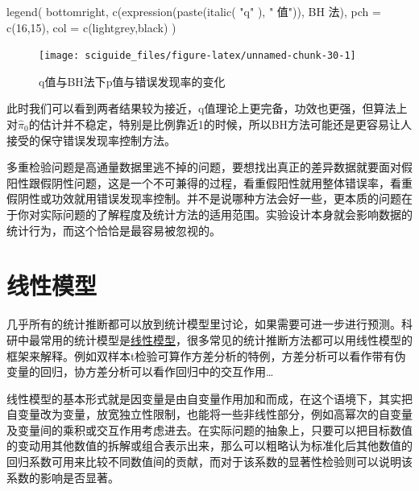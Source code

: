\documentclass[]{tufte-book}
\newenvironment{Shaded}{}{}
\newcommand{\AttributeTok}[1]{\textcolor[rgb]{0.49,0.56,0.16}{#1}}
\newcommand{\DecValTok}[1]{\textcolor[rgb]{0.25,0.63,0.44}{#1}}
\newcommand{\FunctionTok}[1]{\textcolor[rgb]{0.02,0.16,0.49}{#1}}
\newcommand{\NormalTok}[1]{#1}
\newcommand{\StringTok}[1]{\textcolor[rgb]{0.25,0.44,0.63}{#1}}
\begin{document}
\begin{Shaded}
\begin{Highlighting}[]
\FunctionTok{legend}\NormalTok{(}
  \StringTok{\textquotesingle{}bottomright\textquotesingle{}}\NormalTok{,}
  \FunctionTok{c}\NormalTok{(}\FunctionTok{expression}\NormalTok{(}\FunctionTok{paste}\NormalTok{(}\FunctionTok{italic}\NormalTok{(}
    \StringTok{"q"}
\NormalTok{  ), }\StringTok{" 值"}\NormalTok{)), }\StringTok{\textquotesingle{}BH 法\textquotesingle{}}\NormalTok{),}
  \AttributeTok{pch =} \FunctionTok{c}\NormalTok{(}\DecValTok{16}\NormalTok{,}\DecValTok{15}\NormalTok{),}
  \AttributeTok{col =} \FunctionTok{c}\NormalTok{(}\StringTok{\textquotesingle{}lightgrey\textquotesingle{}}\NormalTok{,}\StringTok{\textquotesingle{}black\textquotesingle{}}\NormalTok{)}
\NormalTok{)}
\end{Highlighting}
\end{Shaded}

\begin{figure}
\texttt{[image: sciguide\_files/figure-latex/unnamed-chunk-30-1]} \caption[q值与BH法下p值与错误发现率的变化]{q值与BH法下p值与错误发现率的变化}\label{fig:unnamed-chunk-30}
\end{figure}

此时我们可以看到两者结果较为接近，q值理论上更完备，功效也更强，但算法上对\(\hat\pi_0\)的估计并不稳定，特别是比例靠近1的时候，所以BH方法可能还是更容易让人接受的保守错误发现率控制方法。

多重检验问题是高通量数据里逃不掉的问题，要想找出真正的差异数据就要面对假阳性跟假阴性问题，这是一个不可兼得的过程，看重假阳性就用整体错误率，看重假阴性或功效就用错误发现率控制。并不是说哪种方法会好一些，更本质的问题在于你对实际问题的了解程度及统计方法的适用范围。实验设计本身就会影响数据的统计行为，而这个恰恰是最容易被忽视的。

\hypertarget{ux7ebfux6027ux6a21ux578b}{%
\section{线性模型}\label{ux7ebfux6027ux6a21ux578b}}

几乎所有的统计推断都可以放到统计模型里讨论，如果需要可进一步进行预测。科研中最常用的统计模型是\href{https://cosx.org/2019/09/common-tests-as-linear-models/}{线性模型}，很多常见的统计推断方法都可以用线性模型的框架来解释。例如双样本t检验可算作方差分析的特例，方差分析可以看作带有伪变量的回归，协方差分析可以看作回归中的交互作用\ldots{}

线性模型的基本形式就是因变量是由自变量作用加和而成，在这个语境下，其实把自变量改为变量，放宽独立性限制，也能将一些非线性部分，例如高幂次的自变量及变量间的乘积或交互作用考虑进去。在实际问题的抽象上，只要可以把目标数值的变动用其他数值的拆解或组合表示出来，那么可以粗略认为标准化后其他数值的回归系数可用来比较不同数值间的贡献，而对于该系数的显著性检验则可以说明该系数的影响是否显著。
\end{document}
